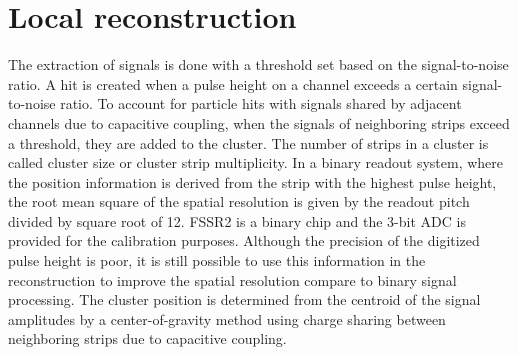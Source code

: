 \section{Local reconstruction}

The extraction of signals is done with a threshold set based on the signal-to-noise ratio. A hit is created when a pulse height on a channel exceeds a certain signal-to-noise ratio. To account for particle hits with signals shared by adjacent channels due to capacitive coupling, when the signals of neighboring strips exceed a threshold, they are added to the cluster. The number of strips in a cluster is called cluster size or cluster strip multiplicity. In a binary readout system, where the position information is derived from the strip with the highest pulse height, the root mean square of the spatial resolution is given by the readout pitch divided by square root of 12. FSSR2 is a binary chip and the 3-bit ADC is provided for the calibration purposes. Although the precision of the digitized pulse height is poor, it is still possible to use this information in the reconstruction to improve the spatial resolution compare to binary signal processing. The cluster position is determined from the centroid of the signal amplitudes by a center-of-gravity method using charge sharing between neighboring strips due to capacitive coupling. 

